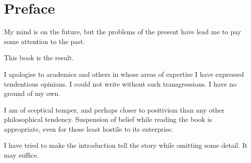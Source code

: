 \chapter*{Preface}


My mind is on the future, but the problems of the present have lead me to pay some attention to the past.

This book is the result.

I apologise to academics and others in whose areas of expertise I have expressed tendentious opinions.
I could not write without such transgressions.
I have no ground of my own.

I am of sceptical temper, and perhaps closer to positivism than any other philosophical tendency.
Suspension of belief while reading the book is appropriate, even for those least hostile to its enterprise.

I have tried to make the introduction tell the story while omitting some detail.
It may suffice.
